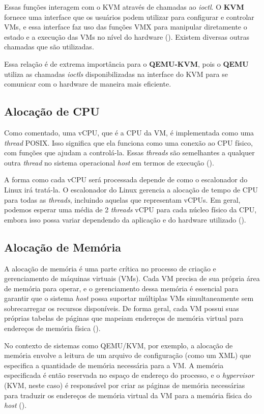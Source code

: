 Essas funções interagem com o KVM através de chamadas ao \textit{ioctl}. O \textbf{KVM} fornece uma interface que os usuários podem utilizar para configurar e controlar VMs, e essa interface faz uso das funções VMX para manipular diretamente o estado e a execução das VMs no nível do hardware (\cite{zabaljauregui2008hardware}). Existem diversas outras chamadas que são utilizadas.

Essa relação é de extrema importância para o \textbf{QEMU-KVM}, pois o \textbf{QEMU} utiliza as chamadas \textit{ioctls} disponibilizadas na interface do KVM para se comunicar com o hardware de maneira mais eficiente.

\subsection{Alocação de CPU}

Como comentado, uma vCPU, que é a CPU da VM, é implementada como uma \textit{thread} POSIX. Isso significa que ela funciona como uma conexão ao CPU físico, com funções que ajudam a controlá-la. Essas \textit{threads} são semelhantes a qualquer outra \textit{thread} no sistema operacional \textit{host} em termos de execução (\cite{chirammal2016mastering}).

A forma como cada vCPU será processada depende de como o escalonador do Linux irá tratá-la. O escalonador do Linux gerencia a alocação de tempo de CPU para todas as \textit{threads}, incluindo aquelas que representam vCPUs. Em geral, podemos esperar uma média de 2 \textit{threads} vCPU para cada núcleo físico da CPU, embora isso possa variar dependendo da aplicação e do hardware utilizado (\cite{TechTargetvCPU}).

\subsection{Alocação de Memória}

A alocação de memória é uma parte crítica no processo de criação e gerenciamento de máquinas virtuais (VMs). Cada VM precisa de sua própria área de memória para operar, e o gerenciamento dessa memória é essencial para garantir que o sistema \textit{host} possa suportar múltiplas VMs simultaneamente sem sobrecarregar os recursos disponíveis. De forma geral, cada VM possui suas próprias tabelas de páginas que mapeiam endereços de memória virtual para endereços de memória física (\cite{modernOS}).

No contexto de sistemas como QEMU/KVM, por exemplo, a alocação de memória envolve a leitura de um arquivo de configuração (como um XML) que especifica a quantidade de memória necessária para a VM. A memória especificada é então reservada no espaço de endereço do processo, e o \textit{hypervisor} (KVM, neste caso) é responsável por criar as páginas de memória necessárias para traduzir os endereços de memória virtual da VM para a memória física do \textit{host} (\cite{chirammal2016mastering}).

